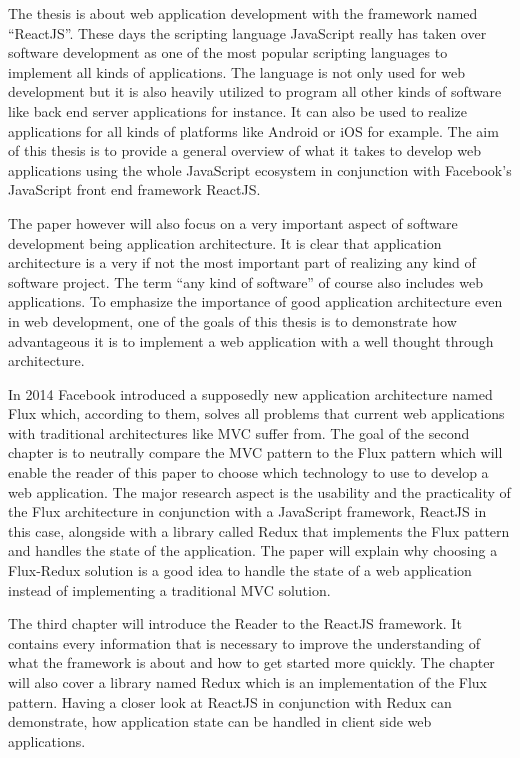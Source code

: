 The thesis is about web application development with the framework named \enquote{ReactJS}. These days the scripting language JavaScript really has taken over software development as one of the most popular scripting languages to implement all kinds of applications. The language is not only used for web development but it is also heavily utilized to program all other kinds of software like back end server applications for instance. It can also be used to realize applications for all kinds of platforms like Android or iOS for example. The aim of this thesis is to provide a general overview of what it takes to develop web applications using the whole JavaScript ecosystem in conjunction with Facebook's JavaScript front end framework ReactJS.

The paper however will also focus on a very important aspect of software development being application architecture. It is clear that application architecture is a very if not the most important part of realizing any kind of software project. The term \enquote{any kind of software} of course also includes web applications. To emphasize the importance of good application architecture even in web development, one of the goals of this thesis is to demonstrate how advantageous it is to implement a web application with a well thought through architecture. 

In 2014 Facebook introduced a supposedly new application architecture named Flux which, according to them, solves all problems that current web applications with traditional architectures like MVC suffer from. The goal of the second chapter is to neutrally compare the MVC pattern to the Flux pattern which will enable the reader of this paper to choose which technology to use to develop a web application. The major research aspect is the usability and the practicality of the Flux architecture in conjunction with a JavaScript framework, ReactJS in this case, alongside with a library called Redux that implements the Flux pattern and handles the state of the application. The paper will explain why choosing a Flux-Redux solution is a good idea to handle the state of a web application instead of implementing a traditional MVC solution.

The third chapter will introduce the Reader to the ReactJS framework. It contains every information that is necessary to improve the understanding of what the framework is about and how to get started more quickly. The chapter will also cover a library named Redux which is an implementation of the Flux pattern. Having a closer look at ReactJS in conjunction with Redux can demonstrate, how application state can be handled in client side web applications.

